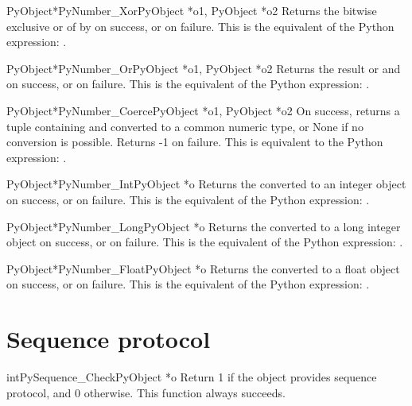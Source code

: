      \begin{cfuncdesc}{PyObject*}{PyNumber_Xor}{PyObject *o1, PyObject *o2}
	 Returns the bitwise exclusive or of  by  on success, or
	 {\NULL} on failure.  This is the equivalent of the Python
	 expression: .
     \end{cfuncdesc}

     \begin{cfuncdesc}{PyObject*}{PyNumber_Or}{PyObject *o1, PyObject *o2}
	 Returns the result or  and  on success, or {\NULL} on
	 failure.  This is the equivalent of the Python expression: 
	 .
     \end{cfuncdesc}


     \begin{cfuncdesc}{PyObject*}{PyNumber_Coerce}{PyObject *o1, PyObject *o2}
         On success, returns a tuple containing  and  converted to
	 a common numeric type, or None if no conversion is possible.
	 Returns -1 on failure. This is equivalent to the Python
	 expression: .
     \end{cfuncdesc}


     \begin{cfuncdesc}{PyObject*}{PyNumber_Int}{PyObject *o}
	 Returns the  converted to an integer object on success, or
	 {\NULL} on failure.  This is the equivalent of the Python
	 expression: .
     \end{cfuncdesc}


     \begin{cfuncdesc}{PyObject*}{PyNumber_Long}{PyObject *o}
	 Returns the  converted to a long integer object on success,
	 or {\NULL} on failure.  This is the equivalent of the Python
	 expression: .
     \end{cfuncdesc}


     \begin{cfuncdesc}{PyObject*}{PyNumber_Float}{PyObject *o}
	 Returns the  converted to a float object on success, or {\NULL}
	 on failure.  This is the equivalent of the Python expression:
	 .
     \end{cfuncdesc}


\section{Sequence protocol}

     \begin{cfuncdesc}{int}{PySequence_Check}{PyObject *o}
         Return 1 if the object provides sequence protocol, and 0
	 otherwise.  
	 This function always succeeds.
     \end{cfuncdesc}


